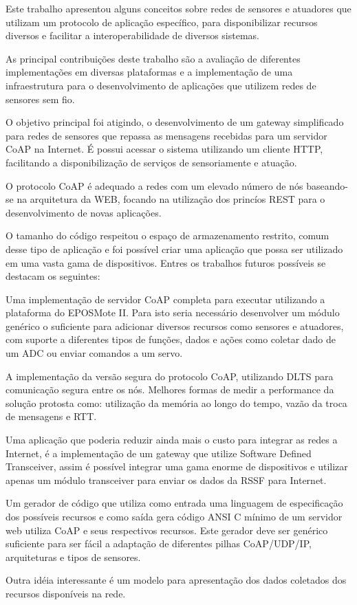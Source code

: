 Este trabalho apresentou alguns conceitos sobre redes de sensores e atuadores que utilizam um protocolo de aplica\c{c}\~ao espec\'ifico, para disponibilizar recursos diversos e facilitar a interoperabilidade de diversos sistemas.

As principal contribui\c{c}\~oes deste trabalho s\~ao a avalia\c{c}\~ao de diferentes implementa\c{c}\~oes em diversas plataformas e a implementa\c{c}\~ao de uma infraestrutura para o desenvolvimento de aplica\c{c}\~oes que utilizem redes de sensores sem fio.

O objetivo principal foi atigindo, o desenvolvimento de um gateway simplificado para redes de sensores que repassa as mensagens recebidas para um servidor CoAP na Internet. \'E possui acessar o sistema utilizando um cliente HTTP, facilitando a disponibiliza\c{c}\~ao de servi\c{c}os de sensoriamente e atua\c{c}\~ao.

O protocolo CoAP \'e adequado a redes com um elevado n\'umero de n\'os baseando-se na arquitetura da WEB, focando na utiliza\c{c}\~ao dos princ\'ios REST para o desenvolvimento de novas aplica\c{c}\~oes.

O tamanho do c\'odigo respeitou o espa\c{c}o de armazenamento restrito, comum desse tipo de aplica\c{c}\~ao e foi poss\'ivel criar uma aplica\c{c}\~ao que possa ser utilizado em uma vasta gama de dispositivos. Entres os trabalhos futuros poss\'iveis se destacam os seguintes:

Uma implementa\c{c}\~ao de servidor CoAP completa para executar utilizando a plataforma do EPOSMote II. Para isto seria necess\'ario desenvolver um m\'odulo gen\'erico o suficiente para adicionar diversos recursos como sensores e atuadores, com suporte a diferentes tipos de fun\c{c}\~oes, dados e a\c{c}\~oes como coletar dado de um ADC ou enviar comandos a um servo.

A implementa\c{c}\~ao da vers\~ao segura do protocolo CoAP, utilizando DLTS para comunica\c{c}\~ao segura entre os n\'os. Melhores formas de medir a performance da solu\c{c}\~ao protosta como: utiliza\c{c}\~ao da mem\'oria ao longo do tempo, vaz\~ao da troca de mensagens e RTT.

Uma aplica\c{c}\~ao que poderia reduzir ainda mais o custo para integrar as redes a Internet, \'e a implementa\c{c}\~ao de um gateway que utilize Software Defined Transceiver, assim \'e poss\'ivel integrar uma gama enorme de dispositivos e utilizar apenas um m\'odulo transceiver para enviar os dados da RSSF para Internet.

Um gerador de c\'odigo que utiliza como entrada uma linguagem de especifica\c{c}\~ao dos poss\'iveis recursos e como sa\'ida gera c\'odigo ANSI C m\'inimo de um servidor web utiliza CoAP e seus respectivos recursos. Este gerador deve ser gen\'erico suficiente para ser f\'acil a adapta\c{c}\~ao de diferentes pilhas CoAP/UDP/IP, arquiteturas e tipos de sensores.

Outra id\'eia interessante \'e um modelo para apresenta\c{c}\~ao dos dados coletados dos recursos dispon\'iveis na rede.
